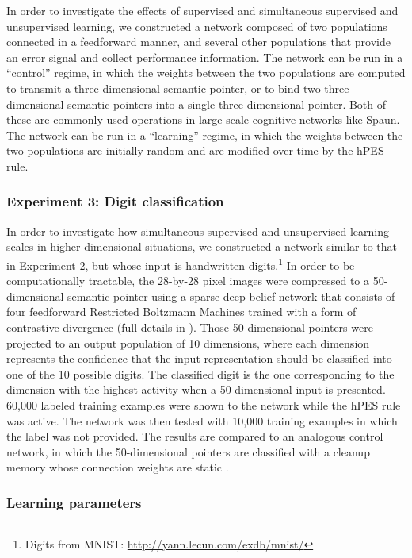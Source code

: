 \documentclass[10pt,letterpaper]{article}
\begin{document}
In order to investigate the effects of supervised and
simultaneous supervised and unsupervised learning,
we constructed a network composed of two populations
connected in a feedforward manner,
and several other populations that provide
an error signal and collect performance information.
The network can be run in a ``control'' regime,
in which the weights between the two populations
are computed to transmit a three-dimensional semantic pointer,
or to bind two three-dimensional semantic pointers
into a single three-dimensional pointer.
Both of these are commonly used operations
in large-scale cognitive networks like Spaun.
The network can be run in a ``learning'' regime,
in which the weights between the two populations
are initially random
and are modified over time by the hPES rule.

\subsubsection{Experiment 3: Digit classification}

In order to investigate how
simultaneous supervised and unsupervised learning
scales in higher dimensional situations,
we constructed a network similar to that in Experiment 2,
but whose input is handwritten digits.\footnote{Digits
  from MNIST: \url{http://yann.lecun.com/exdb/mnist/}}
In order to be computationally tractable,
the 28-by-28 pixel images were compressed to a 50-dimensional
semantic pointer using a sparse deep belief network
that consists of four feedforward
Restricted Boltzmann Machines
trained with a form of contrastive divergence
(full details in ).
Those 50-dimensional pointers were projected to
an output population of 10 dimensions,
where each dimension represents
the confidence that the input representation should
be classified into one of the 10 possible digits.
The classified digit is the one corresponding
to the dimension with the highest activity
when a 50-dimensional input is presented.
60,000 labeled training examples
were shown to the network while
the hPES rule was active.
The network was then tested with 10,000
training examples in which the label
was not provided.
The results are compared to an analogous control network,
in which the 50-dimensional pointers are classified
with a cleanup memory whose connection weights
are static \cite{Eliasmith2012}.

\subsubsection{Learning parameters}
\end{document}

